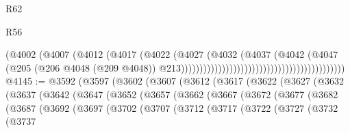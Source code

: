 \begin{lexlean}{R62}
\begin{lexlean}{R56}
\begin{coremodule}
{{{{{{{{{{{{{{{{{{{{{{{{{{{{{{{{{{{{{{{{{{{{{{{{{{{{{{{{{{{{{{{{{{{{{{{{{{{{{{{{{{{{{{{{{{{{{{{{{{{{{{{{{{{{{{{{{{{{{{{{{{{{{{{{{{{{{{{{{{{{{{{{{{{{{{{{{{{{{{{{{{{{{{{{{{{{{{{{{{{{{{{{{{{{{{{{{{{{{{{{{{{{{{{{{{{                                                                      (@4002
                                                                        (@4007
                                                                          (@4012
                                                                            (@4017
                                                                              (@4022
                                                                                (@4027
                                                                                  (@4032
                                                                                    (@4037
                                                                                      (@4042
                                                                                        (@4047
                                                                                          (@205
                                                                                            (@206
                                                                                              @4048
                                                                                              (@209
                                                                                                @4048))
                                                                                            @213))))))))))))))))))))))))))))))))))))))))))))
@4145 := @3592
    (@3597
      (@3602
        (@3607
          (@3612
            (@3617
              (@3622
                (@3627
                  (@3632
                    (@3637
                      (@3642
                        (@3647
                          (@3652
                            (@3657
                              (@3662
                                (@3667
                                  (@3672
                                    (@3677
                                      (@3682
                                        (@3687
                                          (@3692
                                            (@3697
                                              (@3702
                                                (@3707
                                                  (@3712
                                                    (@3717
                                                      (@3722
                                                        (@3727
                                                          (@3732
                                                            (@3737
}}}}}}}}}}}}}}}}}}}}}}}}}}}}}}}}}}}}}}}}}}}}}}}}}}}}}}}}}}}}}}}}}}}}}}}}}}}}}}}}}}}}}}}}}}}}}}}}}}}}}}}}}}}}}}}}}}}}}}}}}}}}}}}}}}}}}}}}}}}}}}}}}}}}}}}}}}}}}}}}}}}}}}}}}}}}}}}}}}}}}}}}}}}}}}}}}}}}}}}}}}}}}}}}}}}
\end{coremodule}
\end{lexlean}
\end{lexlean}
